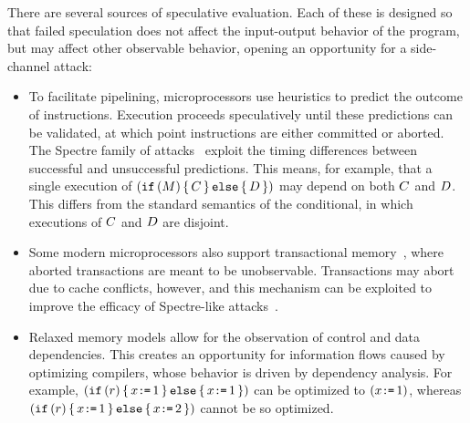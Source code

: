 There are several sources of speculative evaluation.  Each of these is
designed so that failed speculation does not affect the input-output behavior
of the program, but may affect other observable behavior, opening an opportunity
for a side-channel attack:
\begin{itemize}
\item To facilitate pipelining, microprocessors use heuristics to predict the
  outcome of instructions. Execution proceeds speculatively until these predictions can be
  validated, at which point instructions are either committed or
  aborted.  The Spectre family of
  attacks~\cite{DBLP:journals/corr/abs-1801-01203} exploit the timing
  differences between successful and unsuccessful predictions.  This means,
  for example, that a single execution of
  $(\texttt{if}\,(M)\,\{\, C \,\}\,\texttt{else}\,\{\, D \,\})$ may depend on both $C$ and
  $D$.  This differs from the standard semantics of the conditional, in
  which executions of $C$ and $D$ are disjoint.
\item Some modern microprocessors also support transactional
  memory~\cite{ChongSW18}, where aborted transactions are meant to be
  unobservable.  Transactions may abort due to cache conflicts, however, and
  this mechanism can be exploited to improve the efficacy of Spectre-like
  attacks~\cite{DBLP:conf/uss/DisselkoenKPT17}.
\item Relaxed memory models
  \cite{Manson:2005:JMM:1047659.1040336,Boehm:2008:FCC:1375581.1375591,DBLP:conf/popl/ZhaoNMZ12}
  allow for the observation of control and data dependencies. This creates an
  opportunity for information flows caused by optimizing compilers, whose
  behavior is driven by dependency analysis.  For example,
  $(\texttt{if}\,(r)\,\{\, x\texttt{:}\mkern-1mu\texttt{=}\,1 \,\}\,\texttt{else}\,\{\, x\texttt{:}\mkern-1mu\texttt{=}\,1 \,\})$ can be optimized to
  $(x\texttt{:}\mkern-1mu\texttt{=}\,1)$, whereas
  $(\texttt{if}\,(r)\,\{\, x\texttt{:}\mkern-1mu\texttt{=}\,1 \,\}\,\texttt{else}\,\{\, x\texttt{:}\mkern-1mu\texttt{=}\,2 \,\})$ cannot be so
  optimized.  
\end{itemize}

